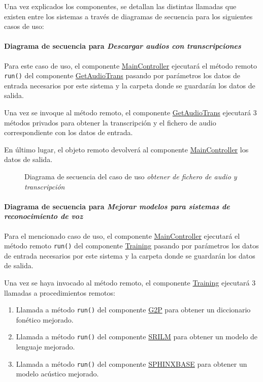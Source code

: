 \documentclass[../main.tex]{subfiles}
\begin{document}
Una vez explicados los componentes, se detallan las distintas llamadas que existen entre los sistemas a través de diagramas de secuencia para los siguientes casos de uso:

\paragraph{Diagrama de secuencia para \textit{Descargar audios con transcripciones}}

Para este caso de uso, el componente \hyperref[par:maincontroller]{MainController} ejecutará el método remoto \verb+run()+ del componente  \hyperref[par:getaudiotrans]{GetAudioTrans} pasando por parámetros los datos de entrada necesarios por este sistema y la carpeta donde se guardarán los datos de salida.

Una vez se invoque al método remoto, el componente \hyperref[par:getaudiotrans]{GetAudioTrans} ejecutará 3 métodos privados para obtener la transcripción y el fichero de audio correspondiente con los datos de entrada.

En último lugar, el objeto remoto devolverá al componente \hyperref[par:maincontroller]{MainController} los datos de salida.

\begin{figure}[H]
    \centering
    
    \caption{Diagrama de secuencia del caso de uso \textit{obtener de fichero de audio y transcripción}}
    \label{fig:flow_getaudiotrans}
\end{figure}

\paragraph{Diagrama de secuencia para \textit{Mejorar modelos para sistemas de reconocimiento de voz}}


Para el mencionado caso de uso, el componente \hyperref[par:maincontroller]{MainController} ejecutará el método remoto \verb+run()+ del componente  \hyperref[par:training]{Training} pasando por parámetros los datos de entrada necesarios por este sistema y la carpeta donde se guardarán los datos de salida.

Una vez se haya invocado al método remoto, el componente \hyperref[par:training]{Training} ejecutará 3 llamadas a procedimientos remotos:
\begin{enumerate}
    \item Llamada a método \verb+run()+ del componente \hyperref[par:g2p]{G2P} para obtener un diccionario fonético mejorado.
    \item Llamada a método \verb+run()+ del componente \hyperref[par:srilm]{SRILM} para obtener un modelo de lenguaje mejorado.
    \item Llamada a método \verb+run()+ del componente \hyperref[par:sphinxbase]{SPHINXBASE} para obtener un modelo acústico mejorado.
\end{enumerate}
\end{document}
